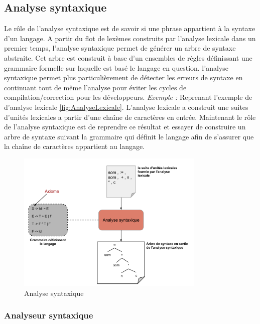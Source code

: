 \documentclass{article}
\begin{document}
\subsection{Analyse syntaxique}
Le rôle de l’analyse syntaxique \cite{refAnalyseSyntaxique} est de savoir si une phrase appartient à la syntaxe d’un langage.
A partir du flot de lexèmes construits par l’analyse lexicale dans un premier temps, l’analyse syntaxique permet de générer un arbre de syntaxe abstraite.
Cet arbre est construit à base d’un ensembles de règles définissant une grammaire formelle sur laquelle est basé le langage en question.
l’analyse syntaxique permet plus particulièrement de détecter les erreurs de syntaxe en continuant tout de même l’analyse pour éviter les cycles de compilation/correction pour les développeurs.\newline
\textit{Exemple :}\newline
Reprenant l'exemple de d'analyse lexicale \ref{fig:AnalyseLexicale}. L'analyse lexicale a construit une suites d'unités lexicales a partir d'une chaîne de caractères en entrée.\newline
Maintenant le rôle de l'analyse syntaxique est de reprendre ce résultat et essayer de construire un arbre de syntaxe suivant la grammaire qui définit le langage afin de s'assurer que la chaîne de caractères appartient au langage.

\begin{figure}[h!]
	\centering
		\includegraphics[width=0.80\textwidth]{AnalyseSyntaxique.png}
	\caption{Analyse syntaxique}
	\label{fig:AnalyseSyntaxique}
\end{figure}\FloatBarrier


\subsubsection{Analyseur syntaxique}
\end{document}
